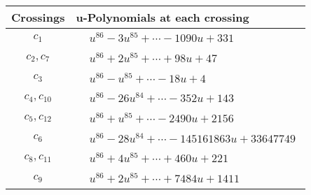 \documentclass[1p]{elsarticle_modified}
\theoremstyle{definition}
\begin{document}
\begin{tabular}{m{50pt}|m{274pt}}
Crossings & \hspace{64pt}u-Polynomials at each crossing \\
\hline $$\begin{aligned}c_{1}\end{aligned}$$&$\begin{aligned}
&u^{86}-3 u^{85}+\cdots-1090 u+331
\end{aligned}$\\
\hline $$\begin{aligned}c_{2},c_{7}\end{aligned}$$&$\begin{aligned}
&u^{86}+2 u^{85}+\cdots+98 u+47
\end{aligned}$\\
\hline $$\begin{aligned}c_{3}\end{aligned}$$&$\begin{aligned}
&u^{86}- u^{85}+\cdots-18 u+4
\end{aligned}$\\
\hline $$\begin{aligned}c_{4},c_{10}\end{aligned}$$&$\begin{aligned}
&u^{86}-26 u^{84}+\cdots-352 u+143
\end{aligned}$\\
\hline $$\begin{aligned}c_{5},c_{12}\end{aligned}$$&$\begin{aligned}
&u^{86}+u^{85}+\cdots-2490 u+2156
\end{aligned}$\\
\hline $$\begin{aligned}c_{6}\end{aligned}$$&$\begin{aligned}
&u^{86}-28 u^{84}+\cdots-145161863 u+33647749
\end{aligned}$\\
\hline $$\begin{aligned}c_{8},c_{11}\end{aligned}$$&$\begin{aligned}
&u^{86}+4 u^{85}+\cdots+460 u+221
\end{aligned}$\\
\hline $$\begin{aligned}c_{9}\end{aligned}$$&$\begin{aligned}
&u^{86}+2 u^{85}+\cdots+7484 u+1411
\end{aligned}$\\
\hline
\end{tabular}\\~\\
\end{document}
